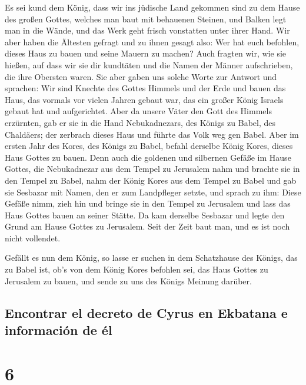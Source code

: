  Es sei kund dem König, dass wir ins jüdische Land
gekommen sind zu dem Hause des großen Gottes, welches man baut mit
behauenen Steinen, und Balken legt man in die Wände, und das Werk geht
frisch vonstatten unter ihrer Hand.  Wir aber haben die
Ältesten gefragt und zu ihnen gesagt also: Wer hat euch befohlen, dieses
Haus zu bauen und seine Mauern zu machen?  Auch fragten
wir, wie sie hießen, auf dass wir sie dir kundtäten und die Namen der
Männer aufschrieben, die ihre Obersten waren.  Sie aber
gaben uns solche Worte zur Antwort und sprachen: Wir sind Knechte des
Gottes Himmels und der Erde und bauen das Haus, das vormals vor vielen
Jahren gebaut war, das ein großer König Israels gebaut hat und
aufgerichtet.  Aber da unsere Väter den Gott des Himmels
erzürnten, gab er sie in die Hand Nebukadnezars, des Königs zu Babel,
des Chaldäers; der zerbrach dieses Haus und führte das Volk weg gen
Babel.  Aber im ersten Jahr des Kores, des Königs zu
Babel, befahl derselbe König Kores, dieses Haus Gottes zu bauen.
 Denn auch die goldenen und silbernen Gefäße im Hause
Gottes, die Nebukadnezar aus dem Tempel zu Jerusalem nahm und brachte
sie in den Tempel zu Babel, nahm der König Kores aus dem Tempel zu Babel
und gab sie Sesbazar mit Namen, den er zum Landpfleger setzte,
 und sprach zu ihm: Diese Gefäße nimm, zieh hin und
bringe sie in den Tempel zu Jerusalem und lass das Haus Gottes bauen an
seiner Stätte.  Da kam derselbe Sesbazar und legte den
Grund am Hause Gottes zu Jerusalem. Seit der Zeit baut man, und es ist
noch nicht vollendet.

 Gefällt es nun dem König, so lasse er suchen in dem
Schatzhause des Königs, das zu Babel ist, ob's von dem König Kores
befohlen sei, das Haus Gottes zu Jerusalem zu bauen, und sende zu uns
des Königs Meinung darüber.

\hypertarget{encontrar-el-decreto-de-cyrus-en-ekbatana-e-informaciuxf3n-de-uxe9l}{%
\subsection{Encontrar el decreto de Cyrus en Ekbatana e información de
él}\label{encontrar-el-decreto-de-cyrus-en-ekbatana-e-informaciuxf3n-de-uxe9l}}

\hypertarget{section-5}{%
\section{6}\label{section-5}}

